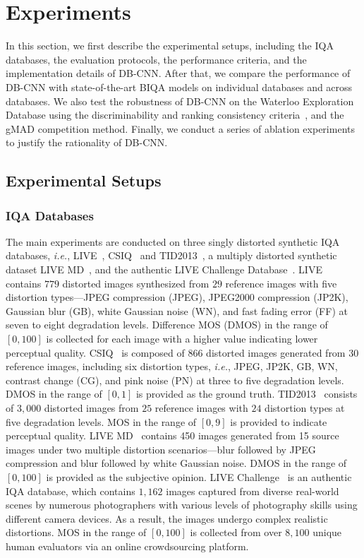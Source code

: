\documentclass[journal]{IEEEtran}
\begin{document}
\section{Experiments}\label{sec:exp}
In this section, we first describe the experimental setups, including the IQA databases, the evaluation protocols, the performance criteria, and the implementation details of DB-CNN. After that, we compare the performance of DB-CNN with state-of-the-art BIQA models on individual databases and across databases. We also test the robustness of DB-CNN on the Waterloo Exploration Database using the discriminability and ranking consistency criteria~\cite{ma2017waterloo}, and the gMAD competition method. Finally, we conduct a series of ablation experiments to justify the rationality of DB-CNN.

\subsection{Experimental Setups}\label{subsec:expsetup}
\subsubsection{IQA Databases}\label{subsec:IQAdatabase}
The main experiments are conducted on three singly distorted synthetic IQA databases, \textit{i.e.}, LIVE~\cite{sheikh2006statistical}, CSIQ~\cite{larson2010most} and TID2013~\cite{ponomarenko2013color}, a multiply distorted synthetic dataset LIVE MD~\cite{Jayaraman2013Objective}, and the authentic LIVE Challenge Database~\cite{ghadiyaram2016massive}. LIVE~\cite{sheikh2006statistical} contains $779$ distorted images synthesized from $29$ reference images with five distortion types---JPEG compression (JPEG), JPEG2000 compression (JP2K), Gaussian blur (GB), white Gaussian noise (WN), and fast fading error (FF) at seven to eight degradation levels. Difference MOS (DMOS) in the range of $[0, 100]$ is collected for each image with a higher value indicating lower perceptual quality. CSIQ~\cite{larson2010most}  is composed of $866$ distorted images generated from $30$ reference images, including six distortion types, \textit{i.e.}, JPEG, JP2K, GB, WN, contrast change (CG), and pink noise (PN) at three to five degradation levels. DMOS in the range of $[0, 1]$ is provided as the ground truth. TID2013~\cite{ponomarenko2013color} consists of $3,000$ distorted images from $25$ reference images with $24$ distortion types at five degradation levels. MOS in the range of $[0, 9]$ is provided to indicate perceptual quality. LIVE MD~\cite{Jayaraman2013Objective} contains 450 images generated from 15 source images under two multiple distortion scenarios---blur followed by JPEG compression and blur followed by white Gaussian noise. DMOS in the range of $[0, 100]$ is provided as the subjective opinion. LIVE Challenge~\cite{ghadiyaram2016massive} is an authentic IQA database, which contains $1,162$ images captured from diverse real-world scenes by numerous photographers with various levels of photography skills using different camera devices. As a result, the images undergo complex realistic distortions. MOS in the range of $[0, 100]$ is collected from over $8,100$ unique human evaluators via an online crowdsourcing platform.
\end{document}
